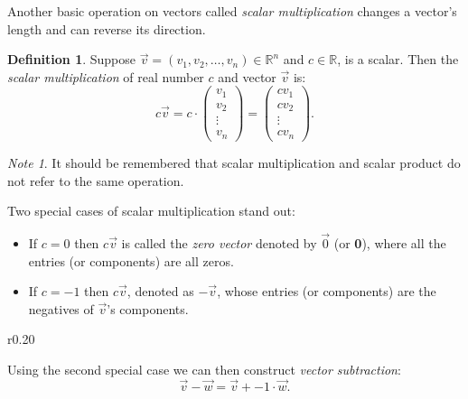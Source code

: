 \documentclass[11pt]{amsart} %
\theoremstyle{plain}
\theoremstyle{definition}
\newtheorem*{dfn}{Definition}
\theoremstyle{definition}
\theoremstyle{remark}
\newtheorem*{note}{Note}
\theoremstyle{definition}
\begin{document}
Another basic operation on vectors called \emph{scalar multiplication} changes a vector's length and can reverse its direction.

\begin{dfn}
      Suppose $\vec{v} = (v_1, v_2,\dots,v_n) \in\mathbb{R}^{n}$ and $c\in\mathbb{R}$, is a scalar. Then the \emph{scalar multiplication} of real number $c$ and vector $\vec{v}$ is:
      \[ c\vec{v}= c \cdot \left( \begin{smallmatrix} v_1 \\ v_2 \\ \vdots \\ v_n \end{smallmatrix} \right) = \left( \begin{smallmatrix} cv_1 \\ cv_2 \\ \vdots \\ cv_n \end{smallmatrix}  \right).  \]
\end{dfn}

\begin{note}
      It should be remembered that scalar multiplication and scalar product do not refer to the same operation.
\end{note}

Two special cases of scalar multiplication stand out:
\begin{itemize}
      \item If $c=0$ then $c\vec{v}$ is called the \emph{zero vector} denoted by $\vec{0}$ (or \textbf{0}), where all the entries (or components) are all zeros.
      \item If $c=-1$ then $c\vec{v}$, denoted as $-\vec{v}$, whose entries (or components) are the negatives of $\vec{v}$'s components.
\end{itemize}


\begin{wrapfigure}{r}{0.20\textwidth}
\end{wrapfigure}
Using the second special case we can then construct \emph{vector subtraction}:
\[ \vec{v}-\vec{w} = \vec{v} + -1\cdot\vec{w}.  \]
\end{document}
